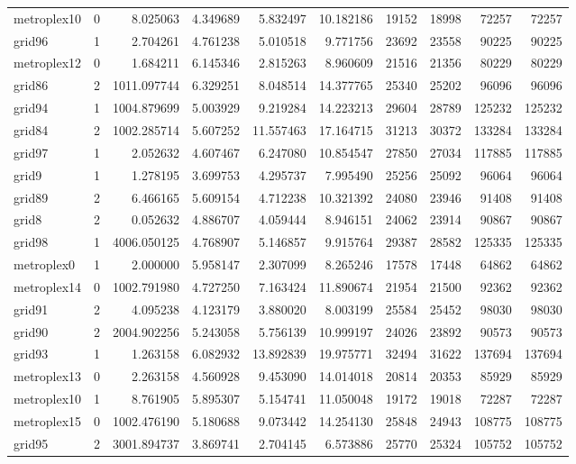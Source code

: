 \begin{longtable}{|l|r|r|r|r|r|r|r|r|r|}
metroplex10 & 0 & 8.025063 & 4.349689 & 5.832497 & 10.182186 & 19152 & 18998 & 72257 & 72257 \\
grid96 & 1 & 2.704261 & 4.761238 & 5.010518 & 9.771756 & 23692 & 23558 & 90225 & 90225 \\
metroplex12 & 0 & 1.684211 & 6.145346 & 2.815263 & 8.960609 & 21516 & 21356 & 80229 & 80229 \\
grid86 & 2 & 1011.097744 & 6.329251 & 8.048514 & 14.377765 & 25340 & 25202 & 96096 & 96096 \\
grid94 & 1 & 1004.879699 & 5.003929 & 9.219284 & 14.223213 & 29604 & 28789 & 125232 & 125232 \\
grid84 & 2 & 1002.285714 & 5.607252 & 11.557463 & 17.164715 & 31213 & 30372 & 133284 & 133284 \\
grid97 & 1 & 2.052632 & 4.607467 & 6.247080 & 10.854547 & 27850 & 27034 & 117885 & 117885 \\
grid9 & 1 & 1.278195 & 3.699753 & 4.295737 & 7.995490 & 25256 & 25092 & 96064 & 96064 \\
grid89 & 2 & 6.466165 & 5.609154 & 4.712238 & 10.321392 & 24080 & 23946 & 91408 & 91408 \\
grid8 & 2 & 0.052632 & 4.886707 & 4.059444 & 8.946151 & 24062 & 23914 & 90867 & 90867 \\
grid98 & 1 & 4006.050125 & 4.768907 & 5.146857 & 9.915764 & 29387 & 28582 & 125335 & 125335 \\
metroplex0 & 1 & 2.000000 & 5.958147 & 2.307099 & 8.265246 & 17578 & 17448 & 64862 & 64862 \\
metroplex14 & 0 & 1002.791980 & 4.727250 & 7.163424 & 11.890674 & 21954 & 21500 & 92362 & 92362 \\
grid91 & 2 & 4.095238 & 4.123179 & 3.880020 & 8.003199 & 25584 & 25452 & 98030 & 98030 \\
grid90 & 2 & 2004.902256 & 5.243058 & 5.756139 & 10.999197 & 24026 & 23892 & 90573 & 90573 \\
grid93 & 1 & 1.263158 & 6.082932 & 13.892839 & 19.975771 & 32494 & 31622 & 137694 & 137694 \\
metroplex13 & 0 & 2.263158 & 4.560928 & 9.453090 & 14.014018 & 20814 & 20353 & 85929 & 85929 \\
metroplex10 & 1 & 8.761905 & 5.895307 & 5.154741 & 11.050048 & 19172 & 19018 & 72287 & 72287 \\
metroplex15 & 0 & 1002.476190 & 5.180688 & 9.073442 & 14.254130 & 25848 & 24943 & 108775 & 108775 \\
grid95 & 2 & 3001.894737 & 3.869741 & 2.704145 & 6.573886 & 25770 & 25324 & 105752 & 105752 \\

\end{longtable}
